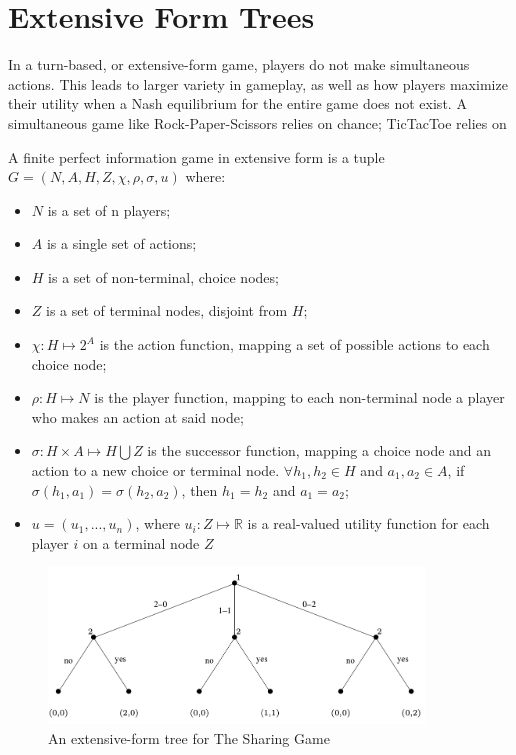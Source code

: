 \section{Extensive Form Trees}
In a turn-based, or extensive-form game, players do not make simultaneous actions. This leads to larger variety in gameplay, as well as how players maximize their utility when a Nash equilibrium for the entire game does not exist. A simultaneous game like Rock-Paper-Scissors relies on chance; TicTacToe relies on 
\begin{define}
  A finite perfect information game in extensive form is a tuple $G = (N, A, H, Z, \chi, \rho, \sigma, u)$ where:
  \begin{itemize}
  \item $N$ is a set of n players;
  \item $A$ is a single set of actions;
  \item $H$ is a set of non-terminal, choice nodes;
  \item $Z$ is a set of terminal nodes, disjoint from $H$;
  \item $\chi: H\mapsto 2^A$ is the action function, mapping a set of possible actions to each choice node;
  \item $\rho: H\mapsto N$ is the player function, mapping to each non-terminal node a player who makes an action at said node;
  \item $\sigma: H\times A\mapsto H\bigcup Z$ is the successor function, mapping a choice node and an action to a new choice or terminal node. $\forall h_1, h_2\in H$ and $a_1, a_2\in A$, if $\sigma(h_1, a_1)=\sigma(h_2, a_2)$, then $h_1=h_2$ and $a_1=a_2$;
  \item $u=(u_1,...,u_n)$, where $u_i:Z\mapsto \mathbb{R}$ is a real-valued utility function for each player $i$ on a terminal node $Z$
  \end{itemize}
\end{define}

\begin{figure}[h]
  \centering
  \includegraphics[width=10cm]{figures/ExampleTree.png}
  \caption{An extensive-form tree for The Sharing Game}
  \label{fig:sharingTree}
\end{figure}

